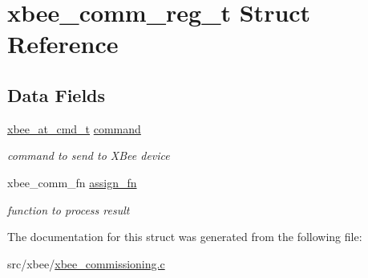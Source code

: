 \hypertarget{structxbee__comm__reg__t}{}\section{xbee\+\_\+comm\+\_\+reg\+\_\+t Struct Reference}
\label{structxbee__comm__reg__t}
\subsection*{Data Fields}
\begin{DoxyCompactItemize}
\item 
\hyperlink{unionxbee__at__cmd__t}{xbee\+\_\+at\+\_\+cmd\+\_\+t} \hyperlink{group__xbee__commissioning_gaa1e66c60bb56acaced6ca2646fd44616}{command}
\begin{DoxyCompactList}\small\item\em command to send to X\+Bee device \end{DoxyCompactList}\item 
xbee\+\_\+comm\+\_\+fn \hyperlink{group__xbee__commissioning_ga7cde42d4d91d04d62d5810e84cde3228}{assign\+\_\+fn}
\begin{DoxyCompactList}\small\item\em function to process result \end{DoxyCompactList}\end{DoxyCompactItemize}


The documentation for this struct was generated from the following file\+:\begin{DoxyCompactItemize}
\item 
src/xbee/\hyperlink{xbee__commissioning_8c}{xbee\+\_\+commissioning.\+c}\end{DoxyCompactItemize}
